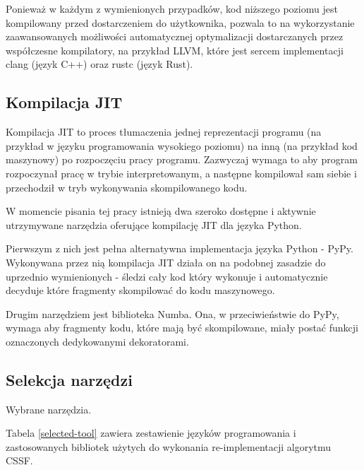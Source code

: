 \documentclass[11pt, a4paper]{article}
\begin{document}
\begin{sloppypar}
    Ponieważ w każdym z wymienionych przypadków, kod niższego poziomu jest kompilowany
    przed dostarczeniem do użytkownika, pozwala to na wykorzystanie zaawansowanych możliwości
    automatycznej optymalizacji dostarczanych przez współczesne kompilatory, na przykład
    LLVM, które jest sercem implementacji clang\cite{ClangHomePage} (język C++) oraz
    rustc (język Rust).

    \subsection{Kompilacja JIT}
    Kompilacja JIT to proces tłumaczenia jednej reprezentacji programu (na przykład w języku
    programowania wysokiego poziomu) na inną (na przykład kod maszynowy) po rozpoczęciu
    pracy programu. Zazwyczaj wymaga to aby program rozpoczynał pracę w trybie interpretowanym,
    a następne kompilował sam siebie i przechodził w tryb wykonywania skompilowanego
    kodu.

    W momencie pisania tej pracy istnieją dwa szeroko dostępne i aktywnie utrzymywane
    narzędzia oferujące kompilację JIT dla języka Python.

    Pierwszym z nich jest pełna alternatywna implementacja języka Python - PyPy\cite{PyPy_Home_Page}.
    Wykonywana przez nią kompilacja JIT działa on na podobnej zasadzie do uprzednio
    wymienionych - śledzi cały kod który wykonuje i automatycznie decyduje które
    fragmenty skompilować do kodu maszynowego\cite{PyPy_JIT}.

    Drugim narzędziem jest biblioteka Numba\cite{Numba_Article}\cite{Numba_Doc}. Ona, w przeciwieństwie
    do PyPy, wymaga aby fragmenty kodu, które mają być skompilowane, miały postać
    funkcji oznaczonych dedykowanymi dekoratorami.

    \subsection{Selekcja narzędzi}
    \FloatBarrier
    \begin{table}[ht]
      \centering
      
      \caption{Wybrane narzędzia.}
      \label{selected-tool}
    \end{table}
    \FloatBarrier

    Tabela \ref{selected-tool} zawiera zestawienie języków programowania i zastosowanych
    bibliotek użytych do wykonania re-implementacji algorytmu CSSF.


\end{sloppypar}
\end{document}
